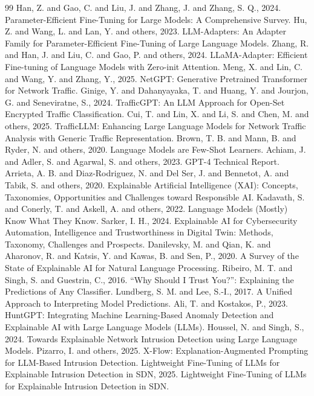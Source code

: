 \documentclass[12pt,a4paper]{article}
\begin{document}
\begin{thebibliography}{99}
 Han, Z. and Gao, C. and Liu, J. and Zhang, J. and Zhang, S. Q., 2024. Parameter-Efficient Fine-Tuning for Large Models: A Comprehensive Survey.
 Hu, Z. and Wang, L. and Lan, Y. and others, 2023. LLM-Adapters: An Adapter Family for Parameter-Efficient Fine-Tuning of Large Language Models.
 Zhang, R. and Han, J. and Liu, C. and Gao, P. and others, 2024. LLaMA-Adapter: Efficient Fine-tuning of Language Models with Zero-init Attention.
 Meng, X. and Lin, C. and Wang, Y. and Zhang, Y., 2025. NetGPT: Generative Pretrained Transformer for Network Traffic.
 Ginige, Y. and Dahanyayaka, T. and Huang, Y. and Jourjon, G. and Seneviratne, S., 2024. TrafficGPT: An LLM Approach for Open-Set Encrypted Traffic Classification.
 Cui, T. and Lin, X. and Li, S. and Chen, M. and others, 2025. TrafficLLM: Enhancing Large Language Models for Network Traffic Analysis with Generic Traffic Representation.
 Brown, T. B. and Mann, B. and Ryder, N. and others, 2020. Language Models are Few-Shot Learners.
 Achiam, J. and Adler, S. and Agarwal, S. and others, 2023. GPT-4 Technical Report.
 Arrieta, A. B. and Diaz-Rodriguez, N. and Del Ser, J. and Bennetot, A. and Tabik, S. and others, 2020. Explainable Artificial Intelligence (XAI): Concepts, Taxonomies, Opportunities and Challenges toward Responsible AI.
 Kadavath, S. and Conerly, T. and Askell, A. and others, 2022. Language Models (Mostly) Know What They Know.
 Sarker, I. H., 2024. Explainable AI for Cybersecurity Automation, Intelligence and Trustworthiness in Digital Twin: Methods, Taxonomy, Challenges and Prospects.
 Danilevsky, M. and Qian, K. and Aharonov, R. and Katsis, Y. and Kawas, B. and Sen, P., 2020. A Survey of the State of Explainable AI for Natural Language Processing.
 Ribeiro, M. T. and Singh, S. and Guestrin, C., 2016. ``Why Should I Trust You?'': Explaining the Predictions of Any Classifier.
 Lundberg, S. M. and Lee, S.-I., 2017. A Unified Approach to Interpreting Model Predictions.
 Ali, T. and Kostakos, P., 2023. HuntGPT: Integrating Machine Learning-Based Anomaly Detection and Explainable AI with Large Language Models (LLMs).
 Houssel, N. and Singh, S., 2024. Towards Explainable Network Intrusion Detection using Large Language Models.
 Pizarro, I. and others, 2025. X-Flow: Explanation-Augmented Prompting for LLM-Based Intrusion Detection.
 Lightweight Fine-Tuning of LLMs for Explainable Intrusion Detection in SDN, 2025. Lightweight Fine-Tuning of LLMs for Explainable Intrusion Detection in SDN.

\end{thebibliography}
\end{document}
